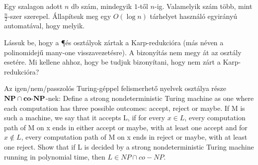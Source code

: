 

\begin{Exercise}[counter={sorszam}, difficulty=1]
	 Egy szalagon adott $n$ db szám, mindegyik $1$-től $n$-ig. Valamelyik szám több, mint $\frac{n}{2}$-szer szerepel. Állapítsuk meg egy $O(\log n)$ tárhelyet használó egyirányú automatával, hogy melyik.
\end{Exercise}





\begin{Exercise}[counter={sorszam}, difficulty=0]
	Lássuk be, hogy a \P és \EXP osztályok zártak a Karp-redukcióra (más néven a polinomidejű many-one visszavezetésre). A bizonyítás nem megy át az \E osztály esetére. Mi kellene ahhoz, hogy be tudjuk bizonyítani, hogy \E nem zárt a Karp-redukcióra?
\end{Exercise}


\begin{Exercise}[counter={sorszam}, difficulty=0]
	Az igen/nem/passzolós Turing-géppel felismerhető nyelvek osztálya része $\mbox{\ensuremath{\mathbf{NP}}} \cap \mbox{\ensuremath{\mathbf{co\text{-}NP}}}$-nek:
	Define a strong nondeterministic Turing machine as one where each computation
	has three possible outcomes: accept, reject or maybe. If M is such
	a machine, we say that it accepts L, if for every $x \in L$, every computation
	path of M on x ends in either accept or maybe, with at least one accept
	and for $x \notin L$, every computation path of M on x ends in reject or maybe,
	with at least one reject.
	Show that if L is decided by a strong nondeterministic Turing machine
	running in polynomial time, then $L \in NP \cap co-NP$.
\end{Exercise}




